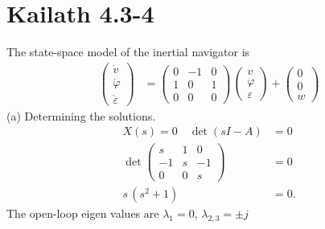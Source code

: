 \section{Kailath 4.3-4}
The state-space model of the inertial navigator is 
\begin{align*}
    \begin{pmatrix}
        \dot v \\ \dot \varphi \\ \dot \varepsilon
    \end{pmatrix} &= \begin{pmatrix}
        0 & -1 & 0 \\ 1 & 0 & 1 \\ 0 & 0 & 0
    \end{pmatrix}\,\begin{pmatrix}
        v \\ \varphi \\ \varepsilon
    \end{pmatrix} + \begin{pmatrix}
        0 \\ 0 \\ w
    \end{pmatrix}
\end{align*}
(a) Determining the solutions. 
\begin{align*}
    X(s) = 0 \quad \det{\left(sI - A\right)} &= 0 \\
    \det\begin{pmatrix}
        s & 1 & 0 \\ -1 & s & -1 \\ 0 & 0 & s
    \end{pmatrix} &= 0\\
    s\,\left(s^2 + 1\right) &= 0.
\end{align*}
The open-loop eigen values are $\lambda_1 = 0$, $\lambda_{2,3} = \pm j$

